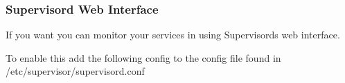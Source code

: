 \subsubsection*{Supervisord Web Interface}

If you want you can monitor your services in using Supervisord\textquotesingle{}s web interface.

To enable this add the following config to the config file found in {\ttfamily /etc/supervisor/supervisord.conf}


\begin{DoxyCode}{0}
\end{DoxyCode}
 